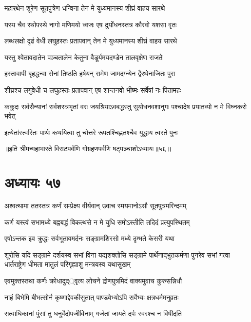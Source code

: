 \twolineshloka
{महारथेन शूरेण सूतपुत्रेण धन्विना}
{तेन मे युध्यमानस्य शीघ्रं वाहय सारथे}


\twolineshloka
{यस्य चैव रथोपस्थे नागो मणिमयो ध्वजः}
{एष दुर्योधनस्तत्र कौरवो यशसा वृतः}


\twolineshloka
{लब्धलक्षो दृढं वेधी लघुहस्तः प्रतापवान्}
{तेन मे युध्यमानस्य शीघ्रं वाहय सारथे}


\twolineshloka
{यस्तु श्वेतावदातेन पञ्चतालेन केतुना}
{वैडूर्यमयदण्डेन तालवृक्षेण राजते}


\twolineshloka
{हस्तावापी बृहद्धन्वा सेनां तिष्ठति हर्षयन्}
{रामेण जामदग्न्येन द्वैरथेनाजितः पुरा}


\twolineshloka
{शीघ्रश्च लगुवेधी च लघुहस्तः प्रतापवान्}
{एष शान्तनवो भीष्मः सर्वेषां नः पितामहः}


\threelineshloka
{ककुदः सर्वसैन्यानां सर्वशस्त्रभृतां वरः}
{जयश्रियाऽवबद्धस्तु सुयोधनवशानुगः}
{पश्चादेष प्रयातव्यो न मे विघ्नकरो भवेत्}


\twolineshloka
{इत्येतांस्त्वरितः पार्थः कथयित्वा तु चोत्तरे}
{रूपतश्चिह्नतश्चैव युद्धाय त्वरते पुनः}

॥इति श्रीमन्महाभारते विराटपर्वणि गोग्रहणपर्वणि षट्पञ्चाशोऽध्यायः॥५६॥

\chapter{अध्यायः ५७}

\twolineshloka
{अश्वत्थामा ततस्तत्र कर्णं सम्प्रेक्ष्य वीर्यवान्}
{उवाच स्मयमानोऽसौ सूतपुत्रमरिन्दमम्}


\twolineshloka
{कर्ण यस्त्वं सभामध्ये बह्वबद्धं विकत्थसे}
{न मे युधि समोऽस्तीति तदिदं प्रत्युपस्थितम्}


\twolineshloka
{एषोऽन्तक इव क्रुद्धः सर्वभूतावमर्दनः}
{सङ्ग्रामशिरसो मध्ये दृम्भते केसरी यथा}


\onelineshloka
{शूरोसि यदि सङ्ग्रामे दर्शयस्व सभां विना}
\threelineshloka
{यद्यशक्तोसि सङ्ग्रामे पार्थेनाद्भुतकर्मणा}
{पुनरेव सभां गत्वा धार्तराष्ट्रेण धीमता}
{मातुलं परिगृह्याशु मन्त्रयस्व यथासुखम्}



\twolineshloka
{एवमुक्तस्तथा कर्णः क्रोधादुद््वृत्य लोचने}
{द्रोणपुत्रमिदं वाक्यमुवाच कुरुसन्निधौ}


\twolineshloka
{नाहं बिभेमि बीभत्सोर्न कृष्णाद्देवकीसुतात्}
{पाण्डवेभ्योऽपि सर्वेभ्यः क्षत्रधर्ममनुव्रतः}


\twolineshloka
{सत्वाधिकानां पुंसां तु धनुर्वेदोपजीविनाम्}
{गर्जतां जायते दर्पः स्वरश्च न विषीदति}


